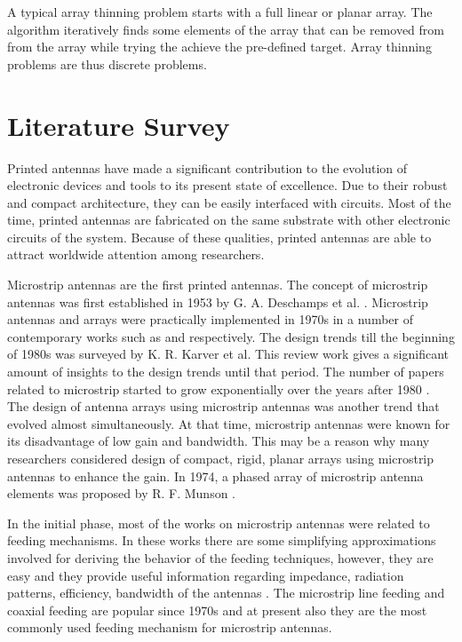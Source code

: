 A typical array thinning problem starts with a full linear or planar array. The algorithm iteratively finds some elements of the array that can be removed from from the array while trying the achieve the pre-defined target. Array thinning problems are thus discrete problems.

\section{Literature Survey} \label{c1sec_litserv}
Printed antennas have made a significant contribution to the evolution of electronic devices and tools to its present state of excellence. Due to their robust and compact architecture, they can be easily interfaced with circuits. Most of the time, printed antennas are fabricated on the same substrate with other electronic circuits of the system. Because of these qualities, printed antennas are able to attract worldwide attention among researchers.

Microstrip antennas are the first printed antennas. The concept of microstrip antennas was first established in 1953 by G. A. Deschamps et al. \cite{mpa00}. Microstrip antennas and arrays were practically implemented in 1970s in a number of contemporary works such as \cite{mpa02} and \cite{mpa01} respectively. The design trends till the beginning of 1980s was surveyed by K. R. Karver et al\cite{mpaSurvTech}. This review work gives a significant amount of insights to the design trends until that period. The number of papers related to microstrip started to grow exponentially over the years after 1980 \cite{mpaHist01}. The design of antenna arrays using microstrip antennas was another trend that evolved almost simultaneously. At that time, microstrip antennas were known for its disadvantage of low gain and bandwidth. This may be a reason why many researchers considered design of compact, rigid, planar arrays using microstrip antennas to enhance the gain. In 1974, a phased array of microstrip antenna elements was proposed by R. F. Munson \cite{txmPhasedArray}.

In the initial phase, most of the works on microstrip antennas were related to feeding mechanisms. In these works there are some simplifying approximations involved for deriving the behavior of the feeding techniques, however, they are easy and they provide useful information regarding impedance, radiation patterns, efficiency, bandwidth of the antennas \cite{mpaReview1992}. The microstrip line feeding and coaxial feeding are popular since 1970s and at present also they are the most commonly used feeding mechanism for microstrip antennas.

